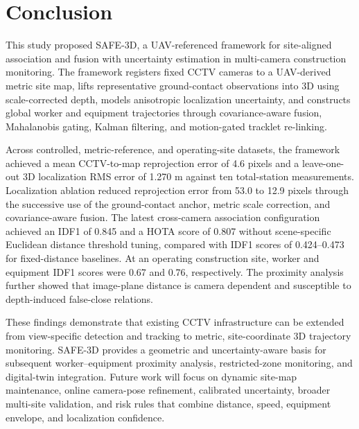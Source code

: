 \section{Conclusion}
\label{sec:conclusion}

This study proposed SAFE-3D, a UAV-referenced framework for site-aligned association and fusion with uncertainty estimation in multi-camera construction monitoring. The framework registers fixed CCTV cameras to a UAV-derived metric site map, lifts representative ground-contact observations into 3D using scale-corrected depth, models anisotropic localization uncertainty, and constructs global worker and equipment trajectories through covariance-aware fusion, Mahalanobis gating, Kalman filtering, and motion-gated tracklet re-linking.

Across controlled, metric-reference, and operating-site datasets, the framework achieved a mean CCTV-to-map reprojection error of 4.6 pixels and a leave-one-out 3D localization RMS error of 1.270 m against ten total-station measurements. Localization ablation reduced reprojection error from 53.0 to 12.9 pixels through the successive use of the ground-contact anchor, metric scale correction, and covariance-aware fusion. The latest cross-camera association configuration achieved an IDF1 of 0.845 and a HOTA score of 0.807 without scene-specific Euclidean distance threshold tuning, compared with IDF1 scores of 0.424--0.473 for fixed-distance baselines. At an operating construction site, worker and equipment IDF1 scores were 0.67 and 0.76, respectively. The proximity analysis further showed that image-plane distance is camera dependent and susceptible to depth-induced false-close relations.

These findings demonstrate that existing CCTV infrastructure can be extended from view-specific detection and tracking to metric, site-coordinate 3D trajectory monitoring. SAFE-3D provides a geometric and uncertainty-aware basis for subsequent worker--equipment proximity analysis, restricted-zone monitoring, and digital-twin integration. Future work will focus on dynamic site-map maintenance, online camera-pose refinement, calibrated uncertainty, broader multi-site validation, and risk rules that combine distance, speed, equipment envelope, and localization confidence.
